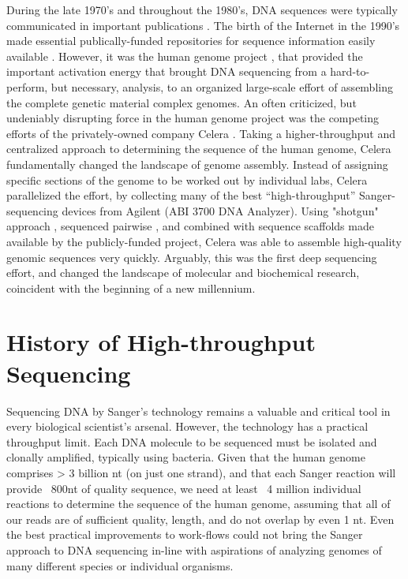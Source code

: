 During the late 1970’s and throughout the 1980’s, DNA sequences were typically communicated in important publications \citep{Cordell1980a,Sanger1978a}. The birth of the Internet in the 1990’s made essential publically-funded repositories for sequence information easily available \citep{Benson2011a}. However, it was the human genome project \citep{Lander2011a,Venter2001}, that provided the important activation energy that brought DNA sequencing from a hard-to-perform, but necessary, analysis, to an organized large-scale effort of assembling the complete genetic material complex genomes. An often criticized, but undeniably disrupting force in the human genome project was the competing efforts of the privately-owned company Celera \citep{Venter2008a}. Taking a higher-throughput and centralized approach to determining the sequence of the human genome, Celera fundamentally changed the landscape of genome assembly. Instead of assigning specific sections of the genome to be worked out by individual labs, Celera parallelized the effort, by collecting many of the best “high-throughput” Sanger-sequencing devices from Agilent (ABI 3700 DNA Analyzer). Using "shotgun" approach \citep{Staden1979}, sequenced pairwise \citep{Roach1995}, and combined with sequence scaffolds made available by the publicly-funded project, Celera was able to assemble high-quality genomic sequences very quickly. Arguably, this was the first deep sequencing effort, and changed the landscape of molecular and biochemical research, coincident with the beginning of a new millennium.

\section{History of High-throughput Sequencing}

Sequencing DNA by Sanger’s technology remains a valuable and critical tool in every biological scientist’s arsenal. However, the technology has a practical throughput limit. Each DNA molecule to be sequenced must be isolated and clonally amplified, typically using bacteria. Given that the human genome \citep{Hattori2005a} comprises > 3 billion nt (on just one strand), and that each Sanger reaction will provide ~800nt of quality sequence, we need at least ~4 million individual reactions to determine the sequence of the human genome, assuming that all of our reads are of sufficient quality, length, and do not overlap by even 1 nt. Even the best practical improvements to work-flows could not bring the Sanger approach to DNA sequencing in-line with aspirations of analyzing genomes of many different species or individual organisms.

